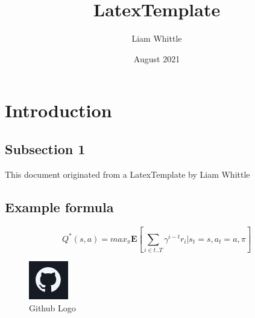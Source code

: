 \documentclass[a4paper]{article}
\title{LatexTemplate}
\author{Liam Whittle}
\date{August 2021}
\begin{document}
\maketitle

\setcounter{secnumdepth}{4}
\tableofcontents

\section{Introduction}

\subsection{Subsection 1}

This document originated from a LatexTemplate by Liam Whittle \cite{LatexTemplate2022}

\subsection{Example formula}
$$Q^*(s, a) = max_{\pi}\mathbf{E}[\sum_{i \in t..T} \gamma^{i-t} r_i | s_t = s, a_t = a, \pi]$$

\begin{figure}
  \includegraphics[width=\linewidth]{github.jpg}
  \caption{Github Logo}
  \label{fig:github}
\end{figure}



\end{document}
